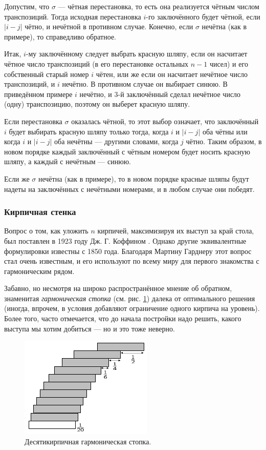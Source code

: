 Допустим, что $\sigma$ --- чётная перестановка, то есть она реализуется чётным числом транспозиций.
Тогда исходная перестановка $i$-го заключённого будет чётной, если $|i - j|$ чётно, и нечётной в противном случае.
Конечно, если $\sigma$ нечётна (как в примере), то справедливо обратное.

Итак, $i$-му заключённому следует выбрать красную шляпу, если он насчитает чётное число транспозиций (в его перестановке остальных $n - 1$ чисел) и его собственный старый номер $i$ чётен, или же если он насчитает нечётное число транспозиций, и $i$ нечётно.
В противном случае он выбирает синюю.
В приведённом примере $i$ нечётно, и $3$-й заключённый сделал нечётное число (одну) транспозицию, поэтому он выберет красную шляпу.

Если перестановка $\sigma$ оказалась чётной, то этот выбор означает, что заключённый $i$ будет выбирать красную шляпу только тогда, когда $i$ и $|i - j|$ оба чётны или когда $i$ и $|i - j|$ оба нечётны --- другими словами, когда $j$ чётно.
Таким образом, в новом порядке каждый заключённый с чётным номером будет носить красную шляпу, а каждый с нечётным --- синюю.

Если же $\sigma$ нечётна (как в примере), то в новом порядке красные шляпы будут надеты на заключённых с нечётными номерами, и в любом случае они победят.

\subsubsection*{Кирпичная стенка}

Вопрос о том, как уложить $n$ кирпичей, максимизируя их выступ за край стола, был поставлен в 1923 году Дж. Г. Коффином \cite{12}.
Однако другие эквивалентные формулировки известны с 1850 года.
Благодаря Мартину Гарднеру этот вопрос стал очень известным, и его используют по всему миру для первого знакомства с гармоническим рядом.

Забавно, но несмотря на широко распространённое мнение об обратном, знаменитая \emph{гармоническая стопка} (см. рис. \ref{pic:kirpich1}) далека от оптимального решения (иногда, впрочем, в условия добавляют ограничение одного кирпича на уровень).
Более того, часто отмечается, что до начала постройки надо решить, какого выступа мы хотим добиться --- но и это тоже неверно.

\begin{figure}[ht!]
\centering
\includegraphics[scale=1]{pics/kirpich1}
\caption{Десятикирпичная гармоническая стопка.}
\label{pic:kirpich1}
\end{figure}

